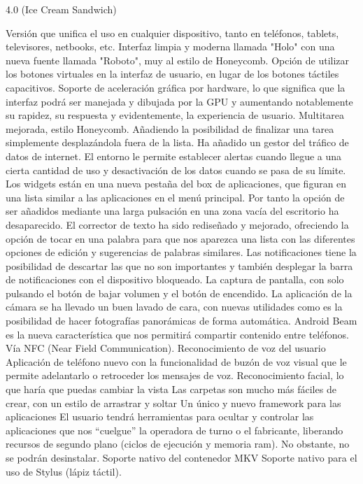 4.0 (Ice Cream Sandwich) 	

    Versión que unifica el uso en cualquier dispositivo, tanto en teléfonos, tablets, televisores, netbooks, etc.
    Interfaz limpia y moderna llamada "Holo" con una nueva fuente llamada "Roboto", muy al estilo de Honeycomb.
    Opción de utilizar los botones virtuales en la interfaz de usuario, en lugar de los botones táctiles capacitivos.
    Soporte de aceleración gráfica por hardware, lo que significa que la interfaz podrá ser manejada y dibujada por la GPU y aumentando notablemente su rapidez, su respuesta y evidentemente, la experiencia de usuario.
    Multitarea mejorada, estilo Honeycomb. Añadiendo la posibilidad de finalizar una tarea simplemente desplazándola fuera de la lista.
    Ha añadido un gestor del tráfico de datos de internet. El entorno le permite establecer alertas cuando llegue a una cierta cantidad de uso y desactivación de los datos cuando se pasa de su límite.
    Los widgets están en una nueva pestaña del box de aplicaciones, que figuran en una lista similar a las aplicaciones en el menú principal. Por tanto la opción de ser añadidos mediante una larga pulsación en una zona vacía del escritorio ha desaparecido.
    El corrector de texto ha sido rediseñado y mejorado, ofreciendo la opción de tocar en una palabra para que nos aparezca una lista con las diferentes opciones de edición y sugerencias de palabras similares.
    Las notificaciones tiene la posibilidad de descartar las que no son importantes y también desplegar la barra de notificaciones con el dispositivo bloqueado.
    La captura de pantalla, con solo pulsando el botón de bajar volumen y el botón de encendido.
    La aplicación de la cámara se ha llevado un buen lavado de cara, con nuevas utilidades como es la posibilidad de hacer fotografías panorámicas de forma automática.
    Android Beam es la nueva característica que nos permitirá compartir contenido entre teléfonos. Vía NFC (Near Field Communication).
    Reconocimiento de voz del usuario
    Aplicación de teléfono nuevo con la funcionalidad de buzón de voz visual que le permite adelantarlo o retroceder los mensajes de voz.
    Reconocimiento facial, lo que haría que puedas cambiar la vista
    Las carpetas son mucho más fáciles de crear, con un estilo de arrastrar y soltar
    Un único y nuevo framework para las aplicaciones
    El usuario tendrá herramientas para ocultar y controlar las aplicaciones que nos “cuelgue” la operadora de turno o el fabricante, liberando recursos de segundo plano (ciclos de ejecución y memoria ram). No obstante, no se podrán desinstalar.
    Soporte nativo del contenedor MKV
    Soporte nativo para el uso de Stylus (lápiz táctil).

